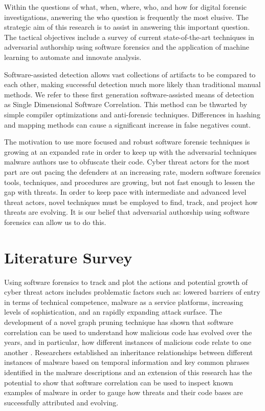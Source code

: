 \documentclass[12pt]{report}
\begin{document}
Within the questions of what, when, where, who, and how for digital forensic investigations, answering the who question is frequently the most elusive.  The strategic aim of this research is to assist in answering this important question.  The tactical objectives include a survey of current state-of-the-art techniques in adversarial authorship using software forensics and the application of machine learning to automate and innovate analysis.

Software-assisted detection allows vast collections of artifacts to be compared to each other, making successful detection much more likely than traditional manual methods.  We refer to these first generation software-assisted means of detection as Single Dimensional Software Correlation.  This method can be thwarted by simple compiler optimizations and anti-forensic techniques.  Differences in hashing and mapping methods can cause a significant increase in false negatives count.

The motivation to use more focused and robust software forensic techniques is growing at an expanded rate in order to keep up with the adversarial techniques malware authors use to obfuscate their code.  Cyber threat actors for the most part are out pacing the defenders at an increasing rate, modern software forensics tools, techniques, and procedures are growing, but not fast enough to lessen the gap with threats.  In order to keep pace with intermediate and advanced level threat actors, novel techniques must be employed to find, track, and project how threats are evolving.  It is our belief that adversarial authorship using software forensics can allow us to do this.

\chapter{Literature Survey}
\label{chap:two}
Using software forensics to track and plot the actions and potential growth of cyber threat actors includes problematic factors such as: lowered barriers of entry in terms of technical competence, malware as a service platforms, increasing levels of sophistication, and an rapidly expanding attack surface.  The development of a novel graph pruning technique has shown that software correlation can be used to understand how malicious code has evolved over the years, and in particular, how different instances of malicious code relate to one another \cite{gupta2009empirical}.  Researchers established an inheritance relationships between different instances of malware based on temporal information and key common phrases identified in the malware descriptions and an extension of this research has the potential to show that software correlation can be used to inspect known examples of malware in order to gauge how threats and their code bases are successfully attributed and evolving.
\end{document}
